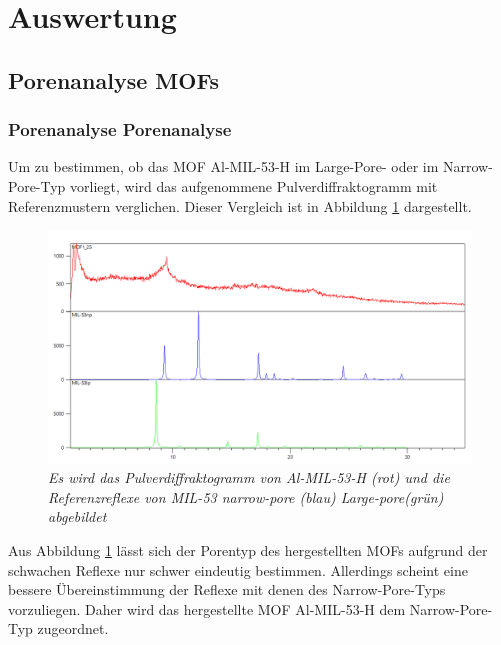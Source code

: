 \documentclass[12pt, a4paper]{article}
\begin{document}
\newpage
\section{Auswertung}
\subsection{Porenanalyse MOFs}
\subsubsection{Porenanalyse Porenanalyse}
Um zu bestimmen, ob das MOF Al-MIL-53-H im Large-Pore- oder im Narrow-Pore-Typ vorliegt, wird das aufgenommene Pulverdiffraktogramm mit Referenzmustern verglichen. 
Dieser Vergleich ist in Abbildung \ref{MOF125ver} dargestellt.
\begin{figure}[!ht]
    \centering
    \includegraphics[scale=0.5]{MOF125ver.png}
    \caption{\textit{Es wird das Pulverdiffraktogramm von Al-MIL-53-H (rot) und die Referenzreflexe von MIL-53 narrow-pore (blau) Large-pore(grün) abgebildet}}
    \label{MOF125ver}
\end{figure}

\noindent
Aus Abbildung \ref{MOF125ver} lässt sich der Porentyp des hergestellten MOFs aufgrund der schwachen Reflexe nur schwer eindeutig bestimmen. 
Allerdings scheint eine bessere Übereinstimmung der Reflexe mit denen des Narrow-Pore-Typs vorzuliegen. 
Daher wird das hergestellte MOF Al-MIL-53-H dem Narrow-Pore-Typ zugeordnet.
\end{document}
